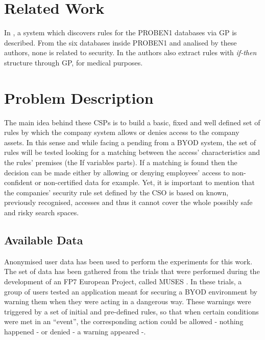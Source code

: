 \documentclass[runningheads,a4paper]{llncs}
\begin{document}
\section{Related Work}
\label{sec:SotA}


In \cite{DeFalco2002257}, a system which discovers rules for the PROBEN1 databases via GP is described. From the six databases inside PROBEN1 and analised by these authors, none is related to security.
In \cite{Tsakonas2004195} the authors also extract rules with \textit{if-then} structure through GP, for medical purposes.

\section{Problem Description}
\label{sec:problem}

The main idea
behind these CSPs is to build a basic, fixed and well defined set of
rules by which the company system allows or denies access to the
company assets. In this sense and while facing a pending %
from a BYOD 
system, the set of rules will be tested looking for a matching between
the access' characteristics and the rules' premises (the If variables
parts). If a matching is found then the decision can be made either by
allowing or denying employees' access to non-confident or
non-certified data for example. Yet, it is important to mention that
the companies' security rule set defined by the CSO is based on known, previously recognised,
accesses and thus it cannot cover the whole possibly safe and risky
search spaces. 


\subsection{Available Data}
\label{subsec:data}

Anonymised user data has been used to perform the experiments for this work. The set of data has been gathered from the trials that were performed during the development of an FP7 European Project, called MUSES \cite{DBLP:conf/sac/MoraCGZJEBAH14}. In these trials, a group of users tested an application meant for securing a BYOD environment by warning them when they were acting in a dangerous way. These warnings were triggered by a set of initial and pre-defined rules, so that when certain conditions were met in an ``event'', the corresponding action could be allowed - nothing happened - or denied - a warning appeared -.
\end{document}
